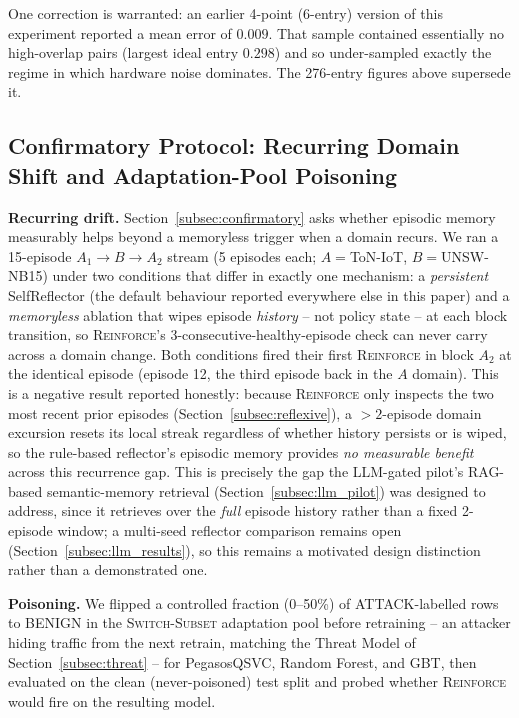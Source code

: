 \documentclass[conference]{IEEEtran}
\begin{document}
One correction is warranted: an earlier 4-point (6-entry) version of this
experiment reported a mean error of $0.009$. That sample contained
essentially no high-overlap pairs (largest ideal entry $0.298$) and so
under-sampled exactly the regime in which hardware noise dominates. The
276-entry figures above supersede it.

\subsection{Confirmatory Protocol: Recurring Domain Shift and Adaptation-Pool Poisoning}
\label{subsec:recurpoison}

\textbf{Recurring drift.} Section~\ref{subsec:confirmatory} asks whether
episodic memory measurably helps beyond a memoryless trigger when a
domain recurs. We ran a 15-episode $A_1\!\to\!B\!\to\!A_2$ stream (5
episodes each; $A{=}$ToN-IoT, $B{=}$UNSW-NB15) under two conditions that
differ in exactly one mechanism: a \emph{persistent} SelfReflector (the
default behaviour reported everywhere else in this paper) and a
\emph{memoryless} ablation that wipes episode \emph{history} -- not
policy state -- at each block transition, so \textsc{Reinforce}'s
3-consecutive-healthy-episode check can never carry across a domain
change. Both conditions fired their first \textsc{Reinforce} in block
$A_2$ at the identical episode (episode 12, the third episode back in the
$A$ domain). This is a negative result reported honestly: because
\textsc{Reinforce} only inspects the two most recent prior episodes
(Section~\ref{subsec:reflexive}), a $>\!2$-episode domain excursion
resets its local streak regardless of whether history persists or is
wiped, so the rule-based reflector's episodic memory provides \emph{no
measurable benefit} across this recurrence gap. This is precisely the
gap the LLM-gated pilot's RAG-based semantic-memory retrieval
(Section~\ref{subsec:llm_pilot}) was designed to address, since it
retrieves over the \emph{full} episode history rather than a
fixed 2-episode window; a multi-seed reflector comparison remains open
(Section~\ref{subsec:llm_results}), so this remains a motivated design
distinction rather than a demonstrated one.

\textbf{Poisoning.} We flipped a controlled fraction
(0--50\%) of ATTACK-labelled rows to BENIGN in the \textsc{Switch-Subset}
adaptation pool before retraining -- an attacker hiding traffic from the
next retrain, matching the Threat Model of
Section~\ref{subsec:threat} -- for PegasosQSVC, Random Forest, and GBT,
then evaluated on the clean (never-poisoned) test split and probed
whether \textsc{Reinforce} would fire on the resulting model.
\end{document}
